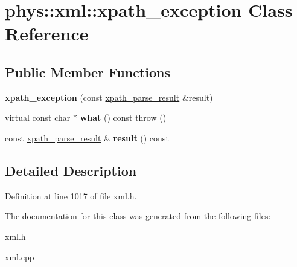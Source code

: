 \hypertarget{classphys_1_1xml_1_1xpath__exception}{
\section{phys::xml::xpath\_\-exception Class Reference}
\label{d1/dcf/classphys_1_1xml_1_1xpath__exception}
}
\subsection*{Public Member Functions}
\begin{DoxyCompactItemize}
\item 
\hypertarget{classphys_1_1xml_1_1xpath__exception_a9a2667d949e2a366f81b8bf8ce6e30a0}{
{\bfseries xpath\_\-exception} (const \hyperlink{structphys_1_1xml_1_1xpath__parse__result}{xpath\_\-parse\_\-result} \&result)}
\label{d1/dcf/classphys_1_1xml_1_1xpath__exception_a9a2667d949e2a366f81b8bf8ce6e30a0}

\item 
\hypertarget{classphys_1_1xml_1_1xpath__exception_ab36b83bb0bacf37aa0d298f724d2a668}{
virtual const char $\ast$ {\bfseries what} () const   throw ()}
\label{d1/dcf/classphys_1_1xml_1_1xpath__exception_ab36b83bb0bacf37aa0d298f724d2a668}

\item 
\hypertarget{classphys_1_1xml_1_1xpath__exception_ac6a47c84f9d434f0eb5d465e5291c490}{
const \hyperlink{structphys_1_1xml_1_1xpath__parse__result}{xpath\_\-parse\_\-result} \& {\bfseries result} () const }
\label{d1/dcf/classphys_1_1xml_1_1xpath__exception_ac6a47c84f9d434f0eb5d465e5291c490}

\end{DoxyCompactItemize}


\subsection{Detailed Description}


Definition at line 1017 of file xml.h.



The documentation for this class was generated from the following files:\begin{DoxyCompactItemize}
\item 
xml.h\item 
xml.cpp\end{DoxyCompactItemize}
